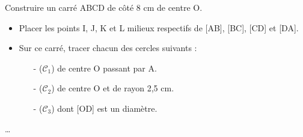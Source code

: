 \begin{exercice*}
   {\small Construire un carré} ABCD de côté 8 cm de centre O.
   \begin{itemize}
      \item Placer les points I, J, K et L milieux respectifs de [AB], [BC], [CD] et [DA].
      \item Sur ce carré, tracer chacun des cercles suivants :
      \begin{itemize}
         \item[-] ($\mathcal{C}_1$) de centre O passant par A.
         \item[-] ($\mathcal{C}_2$) de centre O et de rayon 2,5 cm.
         \item[-] ($\mathcal{C}_3$) dont [OD] est un diamètre.
      \end{itemize}
   \end{itemize}
 \end{exercice*} 
 \begin{corrige}
    \dots
 \end{corrige}
 